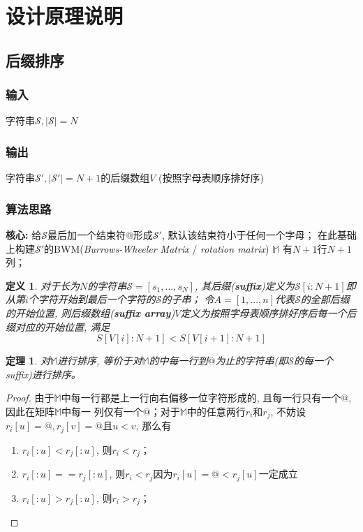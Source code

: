 \documentclass[UTF8]{ctexart}
\newtheorem{define}{定义}
\newtheorem{theory}{定理}
\begin{document}
    \section{设计原理说明}
    \subsection{后缀排序}
    \subsubsection{输入}
    字符串$\mathcal{S}, |\mathcal{S}| = N$%
    \subsubsection{输出}
    字符串$\mathcal{S}', |\mathcal{S}'| = N+1$的后缀数组$V$ (按照字母表顺序排好序)%
    \subsubsection{算法思路}
    \noindent \textbf{核心: }给$\mathcal{S}$最后加一个结束符$@$形成$\mathcal{S}'$, 默认该结束符小于任何一个字母；
    在此基础上构建$\mathcal{S}'$的BWM(\emph{Burrows-Wheeler Matrix} / \emph{rotation matrix}) $\mathbb{M}$ 有$N+1$行$N+1$列；

    \begin{define}
        \label{def1}
        对于长为$N$的字符串$\mathcal{S} = [s_1,...,s_N]$, 其后缀(\textbf{suffix})定义为$\mathcal{S}[i:N+1]$即从第$i$个字符开始到最后一个字符的$\mathcal{S}$的子串；
        令$A=[1,...,n]$代表$\mathcal{S}$的全部后缀的开始位置, 则后缀数组(\textbf{suffix array})$V$定义为按照字母表顺序排好序后每一个后缀对应的开始位置, 满足\begin{equation}
            S[V[i]:N+1] < S[V[i+1]:N+1]
        \end{equation}
    \end{define}

    \begin{theory}
        \label{the1}
        对$\mathbb{M}$进行排序, 等价于对$\mathbb{M}$的中每一行到$@$为止的字符串(即$\mathcal{S}$的每一个suffix)进行排序。
    \end{theory}
    \begin{proof}
        由于$\mathbb{M}$中每一行都是上一行向右偏移一位字符形成的, 且每一行只有一个$@$, 因此在矩阵$\mathbb{M}$中每一
    列仅有一个$@$；对于$\mathbb{M}$中的任意两行$r_i$和$r_j$, 不妨设$r_i[u] = @, r_j[v] = @$且$u<v$, 那么有\begin{enumerate}
        \item $r_i[:u] < r_j[:u]$, 则$r_i < r_j$；
        \item $r_i[:u] == r_j[:u]$, 则$r_i < r_j$因为$r_i[u] = @ < r_j[u]$一定成立
        \item $r_i[:u] > r_j[:u]$, 则$r_i> r_j$；
    \end{enumerate}
    \end{proof}
    
\end{document}
